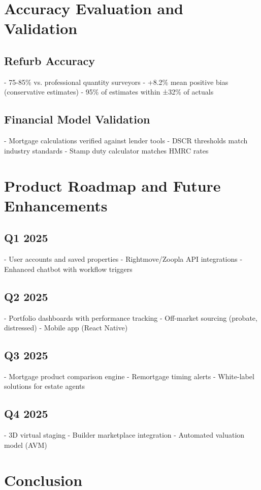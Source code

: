 \documentclass[11pt,a4paper]{article}
\begin{document}
\section{Accuracy Evaluation and Validation}

\subsection{Refurb Accuracy}
- 75-85\% vs. professional quantity surveyors
- +8.2\% mean positive bias (conservative estimates)
- 95\% of estimates within ±32\% of actuals

\subsection{Financial Model Validation}
- Mortgage calculations verified against lender tools
- DSCR thresholds match industry standards
- Stamp duty calculator matches HMRC rates

\section{Product Roadmap and Future Enhancements}

\subsection{Q1 2025}
- User accounts and saved properties
- Rightmove/Zoopla API integrations
- Enhanced chatbot with workflow triggers

\subsection{Q2 2025}
- Portfolio dashboards with performance tracking
- Off-market sourcing (probate, distressed)
- Mobile app (React Native)

\subsection{Q3 2025}
- Mortgage product comparison engine
- Remortgage timing alerts
- White-label solutions for estate agents

\subsection{Q4 2025}
- 3D virtual staging
- Builder marketplace integration
- Automated valuation model (AVM)

\section{Conclusion}
\end{document}
